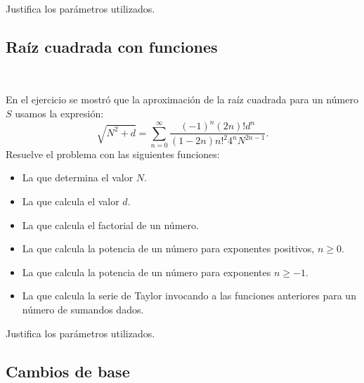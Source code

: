 Justifica los parámetros utilizados.








\separacion
\subsection{Raíz cuadrada con funciones} 

\

En el ejercicio {\sf {} } se mostró que la aproximación de la  raíz cuadrada para un número $S$ usamos la expresión:
 $${\displaystyle {\sqrt {N^{2}+d}}=\sum _{n=0}^{\infty }{\frac {(-1)^{n}(2n)!d^{n}}{(1-2n)n!^{2}4^{n}N^{2n-1}}}}.$$
Resuelve el problema con las siguientes funciones:
\begin{itemize}
\item La que determina el valor $N$.
\item La que calcula el valor $d$.
\item La que calcula el factorial de un número.
\item La que calcula la potencia de un número para exponentes positivos, $n\geq 0$.
\item La que calcula la potencia de un número para exponentes $n\geq -1$.
\item La que calcula la serie de Taylor invocando a las funciones anteriores para un número de sumandos dados.
\end{itemize}

Justifica los parámetros utilizados.







\separacion
\subsection{Cambios de base}


